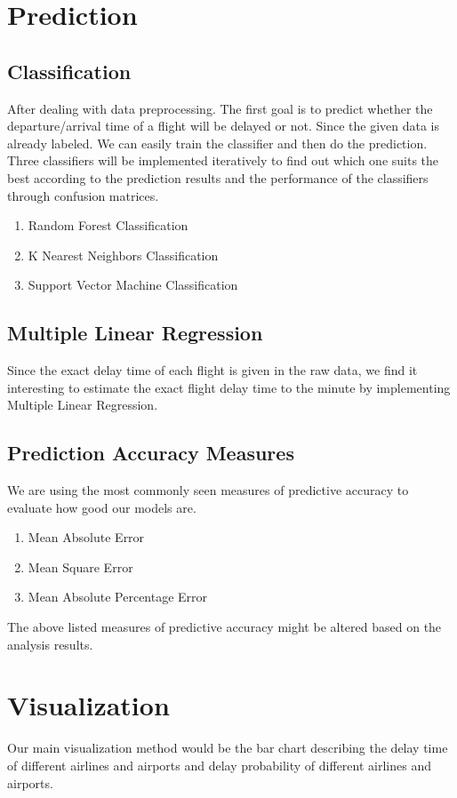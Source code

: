 \documentclass{article}
\begin{document}
\section{Prediction}
\label{prediction}

\subsection{Classification}
After dealing with data preprocessing. The first goal is to predict whether the departure/arrival time of a flight will be delayed or not. Since the given data is already labeled. We can easily train the classifier and then do the prediction. Three classifiers will be implemented iteratively to find out which one suits the best according to the prediction results and the performance of the classifiers through confusion matrices.
\begin{enumerate}
\itemsep0em
\item Random Forest Classification
\item K Nearest Neighbors Classification
\item Support Vector Machine Classification
\end{enumerate}

\subsection{Multiple Linear Regression}
Since the exact delay time of each flight is given in the raw data, we find it interesting to estimate the exact flight delay time to the minute by implementing Multiple Linear Regression.

\subsection{Prediction Accuracy Measures}
We are using the most commonly seen measures of predictive accuracy to evaluate how good our models are.
\begin{enumerate}
\itemsep0em
\item Mean Absolute Error
\item Mean Square Error
\item Mean Absolute Percentage Error
\end{enumerate}
The above listed measures of predictive accuracy might be altered based on the analysis results.

\section{Visualization}
\label{visualization}
Our main visualization method would be the bar chart describing the delay time of different airlines and airports and delay probability of different airlines and airports.
\end{document}
